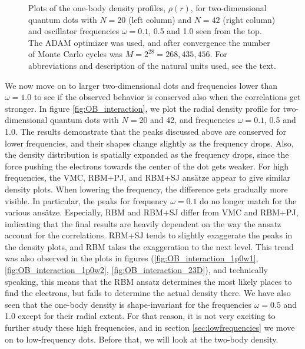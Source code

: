 \begin{figure}
	\caption{Plots of the one-body density profiles, $\rho(r)$, for two-dimensional quantum dots with $N=20$ (left column) and $N=42$ (right column) and oscillator frequencies $\omega=0.1$, 0.5 and 1.0 seen from the top. The ADAM optimizer was used, and after convergence the number of Monte Carlo cycles was $M=2^{28}=268,435,456$. For  abbreviations and description of the natural units used, see the text.}
	\label{fig:OB_interaction}
\end{figure}

We now move on to larger two-dimensional dots and frequencies lower than $\omega=1.0$ to see if the observed behavior is conserved also when the correlations get stronger. In figure \eqref{fig:OB_interaction}, we plot the radial density profile for two-dimensional quantum dots with $N=20$ and 42, and frequencies $\omega=0.1$, 0.5 and 1.0. The results demonstrate that the peaks discussed above are conserved for lower frequencies, and their shapes change slightly as the frequency drops. Also, the density distribution is spatially expanded as the frequency drops, since the force pushing the electrons towards the center of the dot gets weaker. For high frequencies, the VMC, RBM+PJ, and RBM+SJ ansätze appear to give similar density plots. When lowering the frequency, the difference gets gradually more visible. In particular, the peaks for frequency $\omega=0.1$ do no longer match for the various ansätze. Especially, RBM and RBM+SJ differ from VMC and RBM+PJ, indicating that the final results are heavily dependent on the way the ansatz account for the correlations. RBM+SJ tends to slightly exaggerate the peaks in the density plots, and RBM takes the exaggeration to the next level. This trend was also observed in the plots in figures (\ref{fig:OB_interaction_1p0w1}, \ref{fig:OB_interaction_1p0w2}, \ref{fig:OB_interaction_23D}), and technically speaking, this means that the RBM ansatz determines the most likely places to find the electrons, but fails to determine the actual density there. We have also seen that the one-body density is shape-invariant for the frequencies $\omega=0.5$ and 1.0 except for their radial extent. For that reason, it is not very exciting to further study these high frequencies, and in section \ref{sec:lowfrequencies} we move on to low-frequency dots. Before that, we will look at the two-body density.

